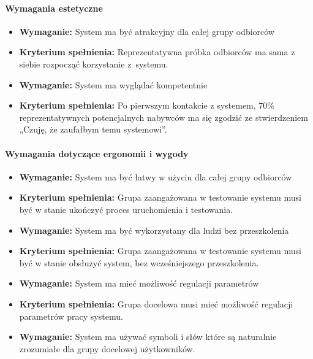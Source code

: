 \documentclass{article}
\begin{document}
\paragraph{Wymagania estetyczne}
\begin{itemize}
\item \textbf{Wymaganie:} System ma być atrakcyjny dla całej grupy odbiorców
\item \textbf{Kryterium spełnienia:} Reprezentatywna próbka odbiorców ma sama z siebie rozpocząć korzystanie z~systemu.\\
\end{itemize}
\begin{itemize}
\item \textbf{Wymaganie:} System ma wyglądać kompetentnie
\item \textbf{Kryterium spełnienia:} Po pierwszym kontakcie z systemem, 70\% reprezentatywnych potencjalnych nabywców ma się zgodzić ze stwierdzeniem „Czuję, że zaufałbym temu systemowi”.
\end{itemize}

\paragraph{Wymagania dotyczące ergonomii i wygody}
\begin{itemize}
\item \textbf{Wymaganie:} System ma być łatwy w użyciu dla całej grupy odbiorców 
\item \textbf{Kryterium spełnienia:} Grupa zaangażowana w testowanie systemu musi być w stanie ukończyć proces uruchomienia i testowania.\\
\end{itemize}
\begin{itemize}
\item \textbf{Wymaganie:} System ma być wykorzystany dla ludzi bez przeszkolenia
\item \textbf{Kryterium spełnienia:} Grupa zaangażowana w testowanie systemu musi być w stanie obsłużyć system, bez wcześniejszego przeszkolenia.\\
\end{itemize}
\begin{itemize}
\item \textbf{Wymaganie:} System ma mieć możliwość regulacji parametrów
\item \textbf{Kryterium spełnienia:} Grupa docelowa musi mieć możliwość regulacji parametrów pracy systemu.\\
\end{itemize}
\begin{itemize}
\item \textbf{Wymaganie:} System ma używać symboli i słów które są naturalnie zrozumiałe dla grupy docelowej użytkowników.
\end{itemize}
\end{document}
